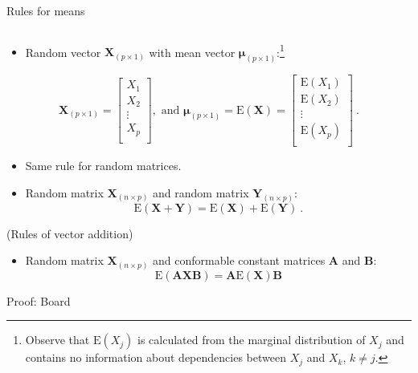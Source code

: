 \documentclass[ignorenonframetext,]{beamer}
\providecommand{\tightlist}{%
  \setlength{\itemsep}{0pt}\setlength{\parskip}{0pt}}
\begin{document}
\begin{frame}

\begin{block}{Rules for means}

\(~\)

\begin{itemize}
\tightlist
\item
  Random vector \(\boldsymbol{X}_{(p\times 1)}\) with mean vector
  \(\boldsymbol{\mu}_{(p\times 1)}\):\footnote{Observe that $\text{E}(X_j)$ is calculated from the marginal distribution of $X_j$ and contains no information about dependencies between $X_{j}$ and $X_k$, $k\neq j$.}
\end{itemize}

\[\boldsymbol{X}_{(p\times 1)}=\left[ \begin{array}{c}X_1\\ X_2\\ \vdots\\ X_p\\ \end{array}\right], \text{ and }\boldsymbol{\mu}_{(p \times 1)}=\text{E}(\boldsymbol{X})=\left[ \begin{array}{c}\text{E}(X_1)\\ \text{E}(X_2)\\ \vdots\\ \text{E}(X_p)\\ \end{array}\right] \ .\]

\begin{itemize}
\tightlist
\item
  Same rule for random matrices.
\end{itemize}

\vspace{2mm}

\begin{itemize}
\tightlist
\item
  Random matrix \(\boldsymbol{X}_{(n\times p)}\) and random matrix
  \(\boldsymbol{Y}_{(n\times p)}\):
  \[\text{E}(\boldsymbol{X}+\boldsymbol{Y})=\text{E}(\boldsymbol{X})+\text{E}(\boldsymbol{Y}) \ .\]
\end{itemize}

(Rules of vector addition)

\end{block}

\end{frame}

\begin{frame}

\begin{itemize}
\tightlist
\item
  Random matrix \(\boldsymbol{X}_{(n\times p)}\) and conformable
  constant matrices \(\boldsymbol{A}\) and \(\boldsymbol{B}\):
  \[\text{E}(\boldsymbol{A}\boldsymbol{X}\boldsymbol{B})=\boldsymbol{A}\text{E}(\boldsymbol{X})\boldsymbol{B}\]
\end{itemize}

Proof: Board

\vspace{60mm}

\end{frame}
\end{document}
